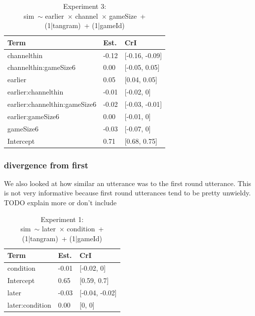 \documentclass[
  english,
  a4paper,
]{article}
\begin{document}
\begin{table}[h!]

\caption{\label{tab:unnamed-chunk-18}Experiment 3:\\ sim~$\sim$ earlier~$\times$ channel~$\times$ gameSize~+ (1|tangram)~+ (1|gameId)}
\centering
\begin{tabular}[t]{lll}
\toprule
Term & Est. & CrI\\
\midrule
channelthin & -0.12 & {}[-0.16, -0.09]\\
channelthin:gameSize6 & 0.00 & {}[-0.05, 0.05]\\
earlier & 0.05 & {}[0.04, 0.05]\\
earlier:channelthin & -0.01 & {}[-0.02, 0]\\
earlier:channelthin:gameSize6 & -0.02 & {}[-0.03, -0.01]\\
\addlinespace
earlier:gameSize6 & 0.00 & {}[-0.01, 0]\\
gameSize6 & -0.03 & {}[-0.07, 0]\\
Intercept & 0.71 & {}[0.68, 0.75]\\
\bottomrule
\end{tabular}
\end{table}

\pagebreak

\hypertarget{divergence-from-first}{%
\subsubsection{divergence from first}\label{divergence-from-first}}

We also looked at how similar an utterance was to the first round utterance. This is not very informative because first round utterances tend to be pretty unwieldy. TODO explain more or don't include

\begin{table}[h!]

\caption{\label{tab:unnamed-chunk-19}Experiment 1:\\ sim~$\sim$ later~$\times$ condition~+ (1|tangram)~+ (1|gameId)}
\centering
\begin{tabular}[t]{lll}
\toprule
Term & Est. & CrI\\
\midrule
condition & -0.01 & {}[-0.02, 0]\\
Intercept & 0.65 & {}[0.59, 0.7]\\
later & -0.03 & {}[-0.04, -0.02]\\
later:condition & 0.00 & {}[0, 0]\\
\bottomrule
\end{tabular}
\end{table}
\end{document}
